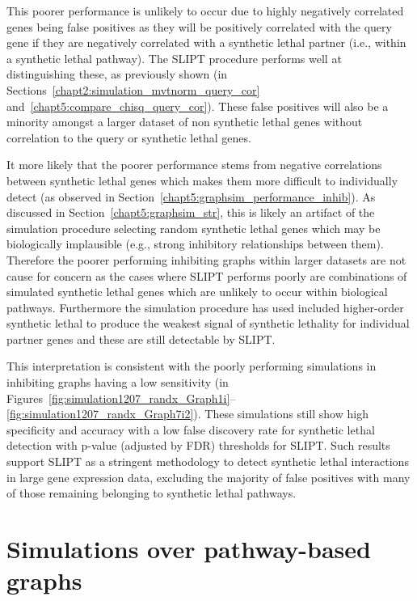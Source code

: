 This poorer performance is unlikely to occur due to highly negatively correlated genes being false positives as they will be positively correlated with the query gene if they are negatively correlated with a synthetic lethal partner (i.e., within a synthetic lethal pathway). The \gls{SLIPT} procedure performs well at distinguishing these, as previously shown (in Sections~\ref{chapt2:simulation_mvtnorm_query_cor} and~\ref{chapt5:compare_chisq_query_cor}). These false positives will also be a minority amongst a larger dataset of non synthetic lethal genes without correlation to the query or synthetic lethal genes.

It more likely that the poorer performance stems from negative correlations between synthetic lethal genes which makes them more difficult to individually detect (as observed in Section~\ref{chapt5:graphsim_performance_inhib}). As discussed in Section~\ref{chapt5:graphsim_str}, this is likely an artifact of the simulation procedure selecting random synthetic lethal genes which may be biologically implausible (e.g., strong inhibitory relationships between them). Therefore the poorer performing inhibiting graphs within larger datasets are not cause for concern as the cases where \gls{SLIPT} performs poorly are combinations of simulated synthetic lethal genes which are unlikely to occur within biological pathways. Furthermore the simulation procedure has used included higher-order synthetic lethal to produce the weakest signal of synthetic lethality for individual partner genes and these are still detectable by \gls{SLIPT}.

This interpretation is consistent with the poorly performing simulations in inhibiting graphs having a low sensitivity (in Figures~\ref{fig:simulation1207_randx_Graph1i}\nobreakdash--\ref{fig:simulation1207_randx_Graph7i2}). These simulations still show high specificity and accuracy with a low false discovery rate for synthetic lethal detection with p-value (adjusted by FDR) thresholds for \gls{SLIPT}. Such results support \gls{SLIPT} as a stringent methodology to detect synthetic lethal interactions in large gene expression data, excluding the majority of false positives with many of those remaining belonging to synthetic lethal pathways.


\FloatBarrier

\section{Simulations over pathway-based graphs}

